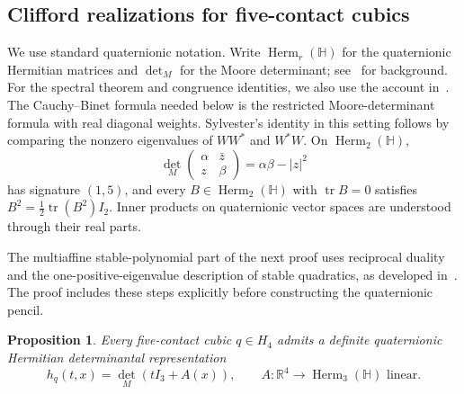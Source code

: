 \documentclass[11pt,onecolumn]{article}
\theoremstyle{blueplain}
\newtheorem{proposition}[proposition]{Proposition}
\theoremstyle{bluedefinition}
\theoremstyle{bluedefinition}
\newcommand{\tr}{\operatorname{tr}}
\begin{document}
\subsection{Clifford realizations for five-contact cubics}

We use standard quaternionic notation.  Write
$\operatorname{Herm}_r(\mathbb H)$ for the quaternionic Hermitian matrices
and $\det_M$ for the Moore determinant; see~\cite{Aslaksen} for background.
For the spectral theorem and congruence identities, we also use the
account in~\cite[expanded version, Appendix~A]{ScottSokal}.
The Cauchy--Binet formula needed below is the restricted Moore-determinant
formula with real diagonal weights. Sylvester's identity in this setting
follows by comparing the nonzero eigenvalues of $WW^*$ and $W^*W$.  On
$\operatorname{Herm}_2(\mathbb H)$,
\[
 \det_M\begin{pmatrix}\alpha&\bar z\\z&\beta\end{pmatrix}
 =\alpha\beta-|z|^2
\]
has signature $(1,5)$, and every
$B\in\operatorname{Herm}_2(\mathbb H)$ with $\tr B=0$ satisfies
$B^2=\frac12\tr(B^2)I_2$.  Inner products on quaternionic vector spaces
are understood through their real parts.

The multiaffine stable-polynomial part of the next proof uses reciprocal
duality and the one-positive-eigenvalue description of stable quadratics,
as developed in~\cite{ChoeOxleySokalWagner}.  The proof includes these
steps explicitly before constructing the quaternionic pencil.

\begin{proposition}
\label{prop:five-quaternionic}
Every five-contact cubic $q\in H_4$ admits a definite quaternionic
Hermitian determinantal representation
\[
 h_q(t,x)=\det_M(tI_3+A(x)),\qquad
 A\colon\mathbb R^4\to\operatorname{Herm}_3(\mathbb H)
 \text{ linear}.
\]
\end{proposition}
\end{document}
